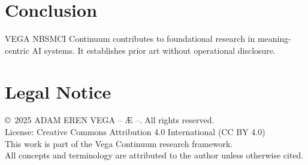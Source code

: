 \documentclass[12pt,a4paper]{article}
\begin{document}
\section{Conclusion}
VEGA NBSMCI Continuum contributes to foundational research in meaning-centric AI systems. It establishes prior art without operational disclosure.

\section*{Legal Notice}
\copyright\ 2025 ADAM EREN VEGA – Æ –. All rights reserved.\\
License: Creative Commons Attribution 4.0 International (CC BY 4.0)\\
This work is part of the Vega Continuum research framework.\\
All concepts and terminology are attributed to the author unless otherwise cited.
\end{document}
